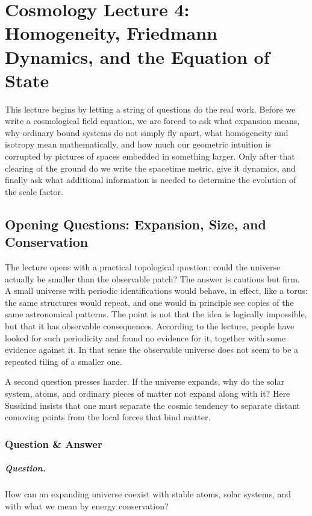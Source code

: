 \chapter{Cosmology Lecture 4: Homogeneity, Friedmann Dynamics, and the Equation of State}

This lecture begins by letting a string of questions do the real work. Before we write a cosmological field equation, we are forced to ask what expansion means, why ordinary bound systems do not simply fly apart, what homogeneity and isotropy mean mathematically, and how much our geometric intuition is corrupted by pictures of spaces embedded in something larger. Only after that clearing of the ground do we write the spacetime metric, give it dynamics, and finally ask what additional information is needed to determine the evolution of the scale factor.

\section{Opening Questions: Expansion, Size, and Conservation}

The lecture opens with a practical topological question: could the universe actually be smaller than the observable patch? The answer is cautious but firm. A small universe with periodic identifications would behave, in effect, like a torus: the same structures would repeat, and one would in principle see copies of the same astronomical patterns. The point is not that the idea is logically impossible, but that it has observable consequences. According to the lecture, people have looked for such periodicity and found no evidence for it, together with some evidence against it. In that sense the observable universe does not seem to be a repeated tiling of a smaller one.

A second question presses harder. If the universe expands, why do the solar system, atoms, and ordinary pieces of matter not expand along with it? Here Susskind insists that one must separate the cosmic tendency to separate distant comoving points from the local forces that bind matter.

\subsection{Question \& Answer}

\paragraph{Question.} How can an expanding universe coexist with stable atoms, solar systems, and with what we mean by energy conservation?

